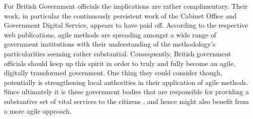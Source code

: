 For British Government officials the implications are rather complimentary. Their work, in particular the continuously persistent work of the Cabinet Office and Government Digital Service, appears to have paid off. According to the respective web publications, agile methods are spreading amongst a wide range of government institutions with their understanding of the methodology's particularities seeming rather substantial. Consequently, British government officials should keep up this spirit in order to truly and fully become an agile, digitally transformed government. One thing they could consider though, potentially is strengthening local authorities in their application of agile methods. Since ultimately it is these government bodies that are responsible for providing a substantive set of vital services to the citizens \parencite{LocalGovernmentAssociation2020}, and hence might also benefit from a more agile approach.


